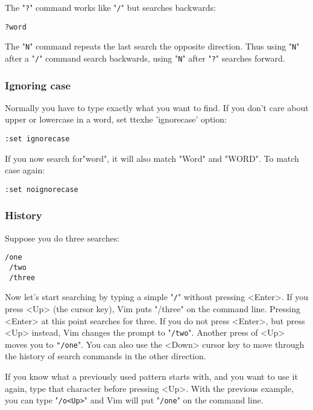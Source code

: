 The "\verb!?!" command works like "\verb!/!" but searches backwards:

 \begin{Verbatim}[samepage=true]
 ?word
 \end{Verbatim}

The "\verb!N!" command repeats the last search the opposite direction.
Thus using "\verb!N!" after a "\verb!/!" command search backwards, using "\verb!N!" after "\verb!?!" searches forward.

\subsubsection{Ignoring case}

Normally you have to type exactly what you want to find.
If you don't care about upper or lowercase in a word, set ttexhe 'ignorecase' option:

 \begin{Verbatim}[samepage=true]
 :set ignorecase
 \end{Verbatim}

If you now search for"word", it will also match "Word" and "WORD".
To match case again:

 \begin{Verbatim}[samepage=true]
 :set noignorecase
 \end{Verbatim}

\subsubsection{History}

Suppose you do three searches:

 \begin{Verbatim}[samepage=true]
 /one
 /two
 /three
 \end{Verbatim}

Now let's start searching by typing a simple "\verb!/!" without pressing <Enter>.
If you press <Up> (the cursor key), Vim puts "/three" on the command line.
Pressing <Enter> at this point searches for three.
If you do not press <Enter>, but press <Up> instead, Vim changes the prompt to "\verb!/two!".
Another press of <Up> moves you to \verb!"/one!".
You can also use the <Down> cursor key to move through the history of search commands in the other direction.

If you know what a previously used pattern starts with, and you want to use it again, type that character before pressing <Up>.
With the previous example, you can type "\verb!/o<Up>!" and Vim will put "\verb!/one!" on the command line.

